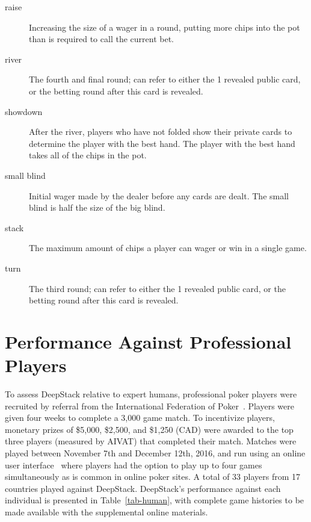 \begin{description}
\item[raise] Increasing the size of a wager in a round, putting more chips into the pot than is required to call the current bet.
\item[river] The fourth and final round; can refer to either the 1 revealed public card, or the betting round after this card is revealed.
\item[showdown] After the river, players who have not folded show their private cards to determine the player with the best hand.  The player with the best hand takes all of the chips in the pot.
\item[small blind] Initial wager made by the dealer before any cards are dealt.  The small blind is half the size of the big blind.
\item[stack] The maximum amount of chips a player can wager or win in a single game.
\item[turn] The third round; can refer to either the 1 revealed public card, or the betting round after this card is revealed.
\end{description}

\section*{Performance Against Professional Players}

To assess DeepStack relative to expert humans, professional poker players were
recruited by referral from the International Federation of Poker~\cite{IFP}.
Players were given four weeks to complete a 3,000 game match.  To incentivize
players, monetary prizes of \$5,000, \$2,500, and \$1,250 (CAD) were awarded to
the top three players (measured by AIVAT) that completed their match.  Matches
were played between November 7th and December 12th, 2016, and run using an
online user interface~\cite{DustinGUISource} where players had the option to play up to
four games simultaneously as is common in online poker sites.  A total of 33 players from 17 countries played
against DeepStack.  DeepStack's performance against each individual is
presented in Table~\ref{tab-human}, with complete game histories to be made available with the supplemental online materials. 

